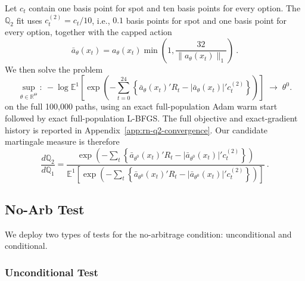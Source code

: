 \documentclass[11pt,a4paper]{article}
\newcommand{\R}{\mathbb{R}}
\newcommand{\E}{\mathbb{E}}
\newcommand{\Q}{\mathbb{Q}}
\renewcommand{\Q}{\mathbb{Q}}
\begin{document}
Let $c_t$ contain one basis point for spot and ten basis points for every
option.  The $\Q_2$ fit uses $c_t^{(2)}=c_t/10$, i.e., $0.1$ basis points for
spot and one basis point for every option, together with the capped action
\begin{equation}
  \bar a_\theta(x_t)
  =a_\theta(x_t)
   \min\!\left(1,\frac{32}{\lVert a_\theta(x_t)\rVert_1}\right) \ .
  \label{eq:rn-action-cap}
\end{equation}
We then solve the problem
\begin{equation}
  \sup_{\theta\in\R^\Theta}: \
  -\log\E^1\!\left[
    \exp\!\left(
      -\sum_{t=0}^{24}\left\{
        \bar a_\theta(x_t)'R_t
        -\lvert\bar a_\theta(x_t)\rvert'c_t^{(2)}
      \right\}
    \right)
  \right]
  \;\longrightarrow\;\theta^0.
  \label{eq:rn-oce-q2-fit}
\end{equation}
on the full 100,000 paths, using an exact full-population Adam warm start
followed by exact full-population L-BFGS.  The full objective and exact-gradient
history is reported in Appendix~\ref{app:rn-q2-convergence}.
Our candidate martingale measure is therefore
\begin{equation}
  \frac{d\Q_2}{d\Q_1}
  =\frac{
    \exp\!\left(
      -\sum_t\left\{
        \bar a_{\theta^0}(x_t)'R_t
        -\lvert\bar a_{\theta^0}(x_t)\rvert'c_t^{(2)}
      \right\}
    \right)
  }{
    \E^1\!\left[
      \exp\!\left(
        -\sum_t\left\{
          \bar a_{\theta^0}(x_t)'R_t
          -\lvert\bar a_{\theta^0}(x_t)\rvert'c_t^{(2)}
        \right\}
      \right)
    \right]
  } \ .
  \label{eq:rn-q2-density}
\end{equation}

\subsection{No-Arb Test}

We deploy two types of tests for the no-arbitrage condition: unconditional and conditional.

\subsubsection{Unconditional Test}
\end{document}
